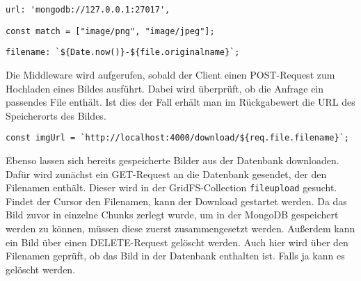 \begin{lstlisting}[caption=Zuweisen der URL der Datenbank, label=lst:url]
    url: 'mongodb://127.0.0.1:27017',
\end{lstlisting}

\begin{lstlisting}[caption=Festlegen der zugelassenen Dateiformate, label=lst:dateiformate]
    const match = ["image/png", "image/jpeg"];
\end{lstlisting}

\begin{lstlisting}[caption=Festlegen des Dateinamens mit Zeitstempel, label=lst:dateiname]
    filename: `${Date.now()}-${file.originalname}`;
\end{lstlisting}

Die Middleware wird aufgerufen, sobald der Client einen POST-Request zum Hochladen eines Bildes ausführt. Dabei wird überprüft, ob die Anfrage ein passendes File enthält. Ist dies der Fall erhält man im Rückgabewert die URL des Speicherorts des Bildes.

\begin{lstlisting}[caption=Speicherort des Bildes, label=lst:speicherortbild]
    const imgUrl = `http://localhost:4000/download/${req.file.filename}`;
\end{lstlisting}

Ebenso lassen sich bereits gespeicherte Bilder aus der Datenbank downloaden. Dafür wird zunächst ein GET-Request an die Datenbank gesendet, der den Filenamen enthält. Dieser wird in der GridFS-Collection \texttt{fileupload} gesucht. Findet der Cursor den Filenamen, kann der Download gestartet werden. Da das Bild zuvor in einzelne Chunks zerlegt wurde, um in der MongoDB gespeichert werden zu können, müssen diese zuerst zusammengesetzt werden. 
Außerdem kann ein Bild über einen DELETE-Request gelöscht werden. Auch hier wird über den Filenamen geprüft, ob das Bild in der Datenbank enthalten ist. Falls ja kann es gelöscht werden.
